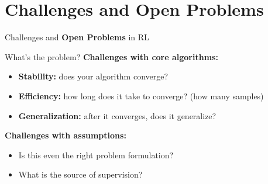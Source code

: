 \section{Challenges and Open Problems}

\begin{frame}{}
    \LARGE Challenges and \textbf{Open Problems} in RL
\end{frame}

\begin{frame}{What's the problem?}
\textbf{Challenges with core algorithms:}
\begin{itemize}
    \item \textbf{Stability:} does your algorithm converge?
    \item \textbf{Efficiency:} how long does it take to converge? (how many samples)
    \item \textbf{Generalization:} after it converges, does it generalize?
\end{itemize}
\vspace{0.8em}
\textbf{Challenges with assumptions:}
\begin{itemize}
    \item Is this even the right problem formulation?
    \item What is the source of supervision?
\end{itemize}
\end{frame}


